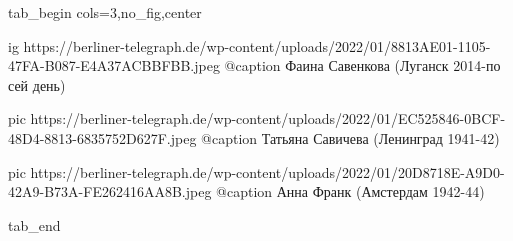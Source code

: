  
 
 
 
 


\ifcmt
  tab_begin cols=3,no_fig,center

     ig https://berliner-telegraph.de/wp-content/uploads/2022/01/8813AE01-1105-47FA-B087-E4A37ACBBFBB.jpeg
     @caption Фаина Савенкова (Луганск 2014-по сей день)

     pic https://berliner-telegraph.de/wp-content/uploads/2022/01/EC525846-0BCF-48D4-8813-6835752D627F.jpeg
     @caption Татьяна Савичева (Ленинград 1941-42)

     pic https://berliner-telegraph.de/wp-content/uploads/2022/01/20D8718E-A9D0-42A9-B73A-FE262416AA8B.jpeg
     @caption Анна Франк (Амстердам 1942-44)

  tab_end
\fi
